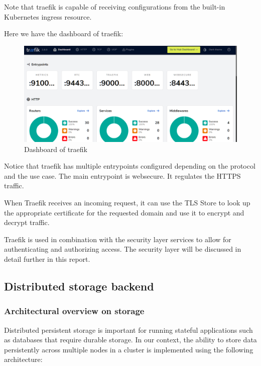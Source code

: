 Note that traefik is capable of receiving configurations from the built-in Kubernetes ingress resource. 

Here we have the dashboard of traefik: 

\begin{figure}[H]\centering
\includegraphics[width=1.0\textwidth,angle=00]{assets/f25.png}
\caption{ Dashboard of traefik }
\label{fig:dashboard of traefik}
\end{figure}

Notice that traefik has multiple entrypoints configured depending on the protocol and the use case. The main entrypoint is websecure. It regulates the HTTPS traffic.  

When Traefik receives an incoming request, it can use the TLS Store to look up the appropriate certificate for the requested domain and use it to encrypt and decrypt traffic. 

Traefik is used in combination with the security layer services to allow for authenticating and authorizing access. The security layer will be discussed in detail further in this report. 

\subsection{Distributed storage backend}

\subsubsection{Architectural overview on storage}

Distributed persistent storage is important for running stateful applications such as databases that require durable storage. In our context, the ability to store data persistently across multiple nodes in a cluster is implemented using the following architecture: 

